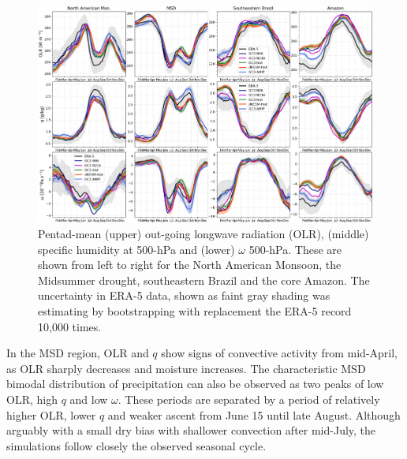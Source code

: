 \begin{figure}[t!]
\centering
 \includegraphics[width=\linewidth]{figures/fig9b.png}
\caption{Pentad-mean (upper) out-going longwave radiation (OLR), (middle) specific humidity at 500-hPa and (lower) $\omega$ 500-hPa. These are shown from left to right for the North American Monsoon, the Midsummer drought, southeastern Brazil and the core Amazon. The uncertainty in ERA-5 data, shown as faint gray shading was estimating by bootstrapping with replacement the ERA-5 record 10,000 times. }
\label{fig:9}
\end{figure}

In the MSD region, OLR and $q$ show signs of convective activity from mid-April, as OLR sharply decreases and moisture increases.
The characteristic MSD bimodal distribution of precipitation can also be observed as two peaks of low OLR, high $q$ and low $\omega$.
These periods are separated by a period of relatively higher OLR, lower $q$ and weaker ascent from June 15 until late August.
Although arguably with a small dry bias with shallower convection after mid-July, the simulations follow closely the observed seasonal cycle.

